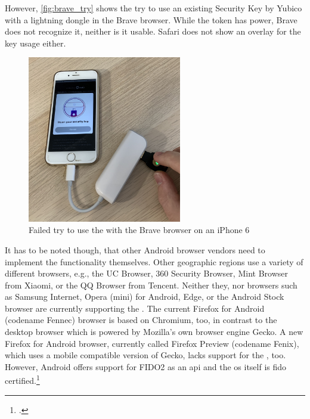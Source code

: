 However, \autoref{fig:brave_try} shows the try to use an existing Security Key by Yubico with a lightning dongle in the Brave browser. While the token has power, Brave does not recognize it, neither is it usable. Safari does not show an overlay for the key usage either.

\begin{figure}[hbt]
	\centering
	\includegraphics[width=0.6\textwidth]{pics/brave_try_dongle.eps}
	\caption[Failed try to use the \wa{} with the Brave browser on an iPhone 6]{Failed try to use the \wa{} with the Brave browser on an iPhone 6\footnotemark}
	\label{fig:brave_try}
\end{figure}

\newpage

It has to be noted though, that other Android browser vendors need to implement the functionality themselves. Other geographic regions use a variety of different browsers, e.g., the UC Browser, 360 Security Browser, Mint Browser from Xiaomi, or the QQ Browser from Tencent. Neither they, nor browsers such as Samsung Internet, Opera (mini) for Android, Edge, or the Android Stock browser are currently supporting the \wa. The current Firefox for Android (codename \frqq Fennec\flqq) browser is based on Chromium, too, in contrast to the desktop browser which is powered by Mozilla's own browser engine Gecko. A new Firefox for Android browser, currently called Firefox Preview (codename \frqq Fenix\flqq), which uses a mobile compatible version of Gecko, lacks support for the \wa, too. However, Android offers support for FIDO2 as an \gls{api} and the \gls{os} itself is \gls{fido} certified.\footcites[See][24]{fido-ct-3}


